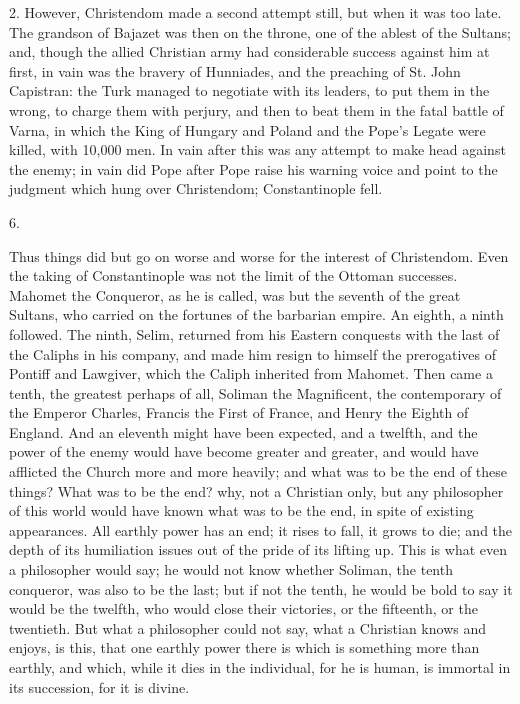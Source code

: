 2. However, Christendom made a
second attempt still, but when it was too late. The grandson of
Bajazet was then on the throne, one of the ablest of the Sultans; and,
though the allied Christian army had considerable success against him
at first, in vain was the bravery of Hunniades, and the preaching of
St. John Capistran: the Turk managed to negotiate with its leaders, to
put them in the wrong, to charge them with perjury, and then to beat
them in the fatal battle of Varna, in which the King of Hungary and
Poland and the Pope's Legate were killed, with 10,000 men. In vain
after this was any attempt to make head against the enemy; in vain did
Pope after Pope raise his warning voice and point to the judgment
which hung over Christendom; Constantinople fell.

6.

Thus things did but go on
worse and worse for the interest of Christendom. Even the taking of
Constantinople was not the limit of the Ottoman successes. Mahomet the
Conqueror, as he is called, was but the seventh of the great Sultans,
who carried on the fortunes of the barbarian empire. An eighth, a
ninth followed. The ninth, Selim, returned from his Eastern conquests
with the last of the Caliphs in his company, and made him resign to
himself the prerogatives of Pontiff and Lawgiver, which the Caliph
inherited from Mahomet. Then came a tenth, the greatest perhaps of
all, Soliman the Magnificent, the contemporary of the Emperor Charles,
Francis the First of France, and Henry the Eighth of England. And an
eleventh might have been expected, and a twelfth, and the power of the
enemy would have become greater and greater, and would have afflicted
the Church more and more heavily; and what was to be the end of these
things? What was to be the end? why, not a Christian only, but any
philosopher of this world would have known what was to be the end, in
spite of existing appearances. All earthly power has an end; it rises
to fall, it grows to die; and the depth of its humiliation issues out
of the pride of its lifting up. This is what even a philosopher would
say; he would not know whether Soliman, the tenth conqueror, was also
to be the last; but if not the tenth, he would be bold to say it would
be the twelfth, who would close their victories, or the fifteenth, or
the twentieth. But what a philosopher could not say, what a Christian
knows and enjoys, is this, that one earthly power there is which is
something more than earthly, and which, while it dies in the
individual, for he is human, is immortal in its succession, for it is
divine.

